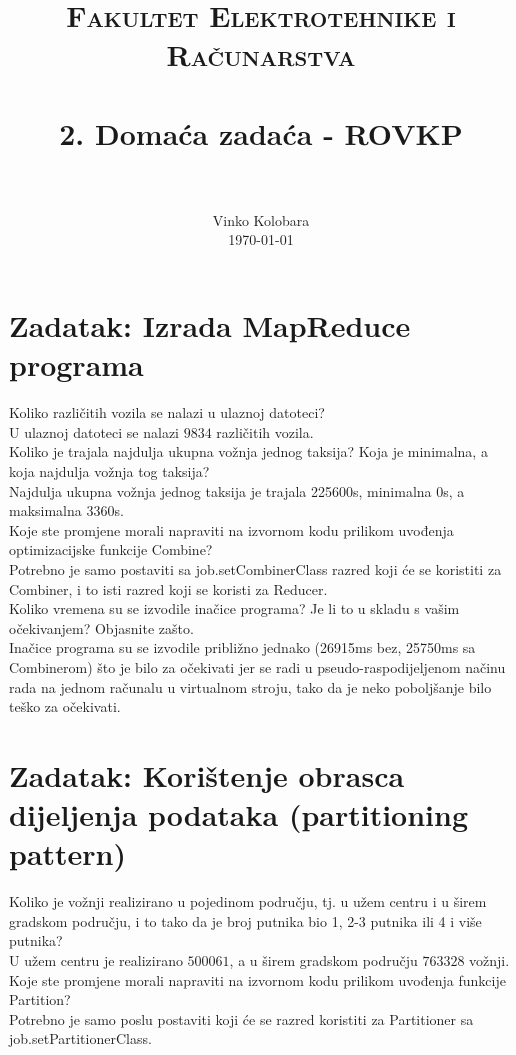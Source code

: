 \documentclass[paper=a4, fontsize=11pt]{scrartcl}
\title{
		\usefont{OT1}{bch}{b}{n}
		\normalfont \normalsize \textsc{Fakultet Elektrotehnike i Računarstva} \\ [25pt]
		\horrule{0.5pt} \\[0.4cm]
		\huge 2. Domaća zadaća - ROVKP \\
		\horrule{2pt} \\[0.5cm]
}
\author{
		\normalfont 								\normalsize
        Vinko Kolobara\\[-3pt]		\normalsize
        \today
}
\date{}
\numberwithin{equation}{section}		%
\numberwithin{figure}{section}			%
\numberwithin{table}{section}				%
\begin{document}
\maketitle

\section{Zadatak: Izrada MapReduce programa}
Koliko različitih vozila se nalazi u ulaznoj datoteci?\\
U ulaznoj datoteci se nalazi $9834$ različitih vozila.\\

Koliko je trajala najdulja ukupna vožnja jednog taksija? Koja je minimalna, a koja najdulja vožnja tog taksija?\\
Najdulja ukupna vožnja jednog taksija je trajala 225600s, minimalna 0s, a maksimalna 3360s.\\

Koje ste promjene morali napraviti na izvornom kodu prilikom uvođenja optimizacijske funkcije Combine?\\
Potrebno je samo postaviti sa job.setCombinerClass razred koji će se koristiti za Combiner, i to isti razred koji se koristi za Reducer.\\

Koliko vremena su se izvodile inačice programa? Je li to u skladu s vašim očekivanjem? Objasnite zašto.\\

Inačice programa su se izvodile približno jednako (26915ms bez, 25750ms sa Combinerom) što je bilo za očekivati jer se radi u pseudo-raspodijeljenom načinu rada na jednom računalu u virtualnom stroju, tako da je neko poboljšanje bilo teško za očekivati.\\

\pagebreak

\section{Zadatak: Korištenje obrasca dijeljenja podataka (partitioning pattern)}
Koliko je vožnji realizirano u pojedinom području, tj. u užem centru i u širem gradskom području, i to tako da je broj putnika bio 1, 2-3 putnika ili 4 i više putnika?\\
U užem centru je realizirano $500061$, a u širem gradskom području $763328$ vožnji.\\

Koje ste promjene morali napraviti na izvornom kodu prilikom uvođenja funkcije Partition?\\
Potrebno je samo poslu postaviti koji će se razred koristiti za Partitioner sa job.setPartitionerClass.\\
\end{document}
